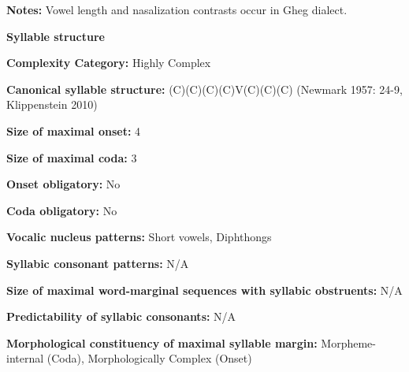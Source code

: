 \begin{styleBody}
\textbf{Notes:} Vowel length and nasalization contrasts occur in Gheg dialect.
\end{styleBody}

\begin{styleBody}
\textbf{Syllable structure}
\end{styleBody}

\begin{styleBody}
\textbf{Complexity Category:} Highly Complex
\end{styleBody}

\begin{styleBody}
\textbf{Canonical syllable structure: }(C)(C)(C)(C)V(C)(C)(C) (Newmark 1957: 24-9, Klippenstein 2010)
\end{styleBody}

\begin{styleBody}
\textbf{Size of maximal onset:} 4
\end{styleBody}

\begin{styleBody}
\textbf{Size of maximal coda:} 3
\end{styleBody}

\begin{styleBody}
\textbf{Onset obligatory:} No
\end{styleBody}

\begin{styleBody}
\textbf{Coda obligatory:} No
\end{styleBody}

\begin{styleBody}
\textbf{Vocalic nucleus patterns:} Short vowels, Diphthongs
\end{styleBody}

\begin{styleBody}
\textbf{Syllabic consonant patterns:} N/A
\end{styleBody}

\begin{styleBody}
\textbf{Size of maximal word{}-marginal sequences with syllabic obstruents:} N/A
\end{styleBody}

\begin{styleBody}
\textbf{Predictability of syllabic consonants:} N/A
\end{styleBody}

\begin{styleBody}
\textbf{Morphological constituency of maximal syllable margin:} Morpheme-internal (Coda), Morphologically Complex (Onset)
\end{styleBody}

